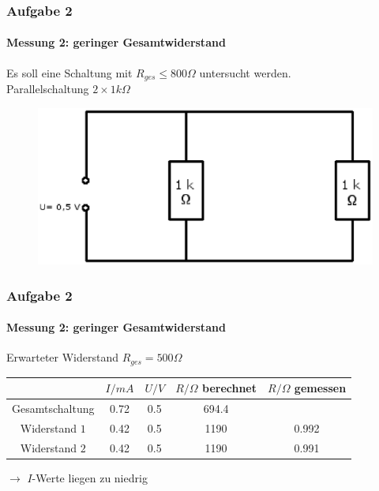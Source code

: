 \begin{frame}
\frametitle{Aufgabe 2}
\framesubtitle{Messung 2: geringer Gesamtwiderstand}
    Es soll eine Schaltung mit $R_{ges} \leq 800 \Omega$ untersucht werden.\\
    Parallelschaltung $2 \times 1k\Omega$ 
    \begin{figure}[H]
    \begin{center}
            \includegraphics[scale=0.6]{./img/parallelschaltung.eps}
    \end{center}
    \end{figure}
    
\end{frame}
\begin{frame}
\frametitle{Aufgabe 2}
\framesubtitle{Messung 2: geringer Gesamtwiderstand}
    Erwarteter Widerstand $R_{ges} = 500\Omega$
    \hline
    \begin{tabular}{c| c c|c|c}
    & $I/mA$ & $U/V$ & $R/\Omega$ berechnet& $R/\Omega$ gemessen \\
            \hline
    Gesamtschaltung & 0.72&0.5&694.4& \\
    Widerstand $1$  & 0.42&0.5&1190&0.992 \\
    Widerstand $2$  & 0.42&0.5&1190&0.991 \\
    \end{tabular}
    $\rightarrow$ $I$-Werte liegen zu niedrig 
\end{frame}


